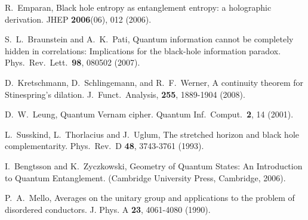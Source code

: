 \documentclass[twocolumn,aps,prl,amsmath,amssymb,floatfix]{revtex4}
\begin{document}
\begin{thebibliography}{18}
 R.\ Emparan,
Black hole entropy as entanglement entropy: a holographic derivation.
JHEP {\bf 2006}(06), 012 (2006).

 S.\ L.\ Braunstein and A.\ K.\ Pati,
Quantum information cannot be completely hidden in
correlations: Implications for the black-hole information paradox.
Phys.\ Rev.\ Lett.\ {\bf 98}, 080502 (2007).

 D.\ Kretschmann, D.\ Schlingemann, and R.\ F.\ Werner,
A continuity theorem for Stinespring's dilation.
J.\ Funct.\ Analysis, {\bf 255}, 1889-1904 (2008).

 D.\ W.\ Leung,
Quantum Vernam cipher.
Quantum Inf.\ Comput.\ {\bf 2}, 14 (2001).

 L.\ Susskind, L.\ Thorlacius and J.\ Uglum,
The stretched horizon and black hole complementarity.
Phys.\ Rev.\ D {\bf 48}, 3743-3761 (1993).

 I.\ Bengtsson and K.\ {Z}yczkowski,
Geometry of Quantum States: An Introduction to Quantum Entanglement.
(Cambridge University Press, Cambridge, 2006).

  P.\ A.\ Mello,
Averages on the unitary group and applications to the problem of
disordered conductors.
J. Phys. A {\bf 23}, 4061-4080 (1990).

\end{thebibliography}
\end{document}
